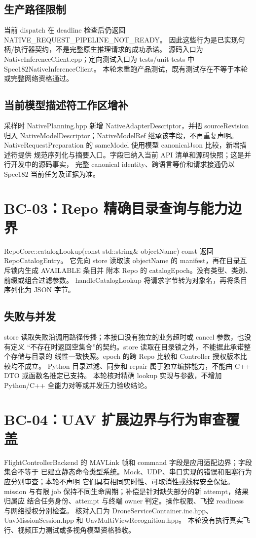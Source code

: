 \subsection{生产路径限制}
当前 dispatch 在 deadline 检查后仍返回 NATIVE\_REQUEST\_PIPELINE\_NOT\_READY。
因此这些行为是已实现句柄/执行器契约，不是完整原生推理请求的成功承诺。
源码入口为 NativeInferenceClient.cpp；定向测试入口为 tests/unit-tests 中 Spec182NativeInferenceClient。
本轮未重跑产品测试，既有测试存在不等于本轮或完整网络资格通过。

\subsection{当前模型描述符工作区增补}
采样时 NativePlanning.hpp 新增 NativeAdapterDescriptor，并把 sourceRevision 归入
NativeModelDescriptor；NativeModelRef 继承该字段，不再重复声明。
NativeRequestPreparation 的 sameModel 使用模型 canonicalJson 比较，新增描述符提供
规范序列化与摘要入口。字段已纳入当前 API 清单和源码快照；这是并行开发中的源码事实，
完整 canonical identity、跨语言等价和请求接通仍以 Spec182 当前任务及证据为准。

\section{BC-03：Repo 精确目录查询与能力边界}
RepoCore::catalogLookup(const std::string\& objectName) const 返回 RepoCatalogEntry。
它先向 store 读取该 objectName 的 manifest，再在目录互斥锁内生成 AVAILABLE 条目并
附本 Repo 的 catalogEpoch。没有类型、类别、前缀或组合过滤参数。
handleCatalogLookup 将请求字节转为对象名，再将条目序列化为 JSON 字节。

\subsection{失败与并发}
store 读取失败沿调用路径传播；本接口没有独立的业务超时或 cancel 参数，也没有定义
“不存在时返回空集合”的契约。store 读取在目录锁之外，不能据此承诺整个存储与目录的
线性一致快照。epoch 的跨 Repo 比较和 Controller 授权版本比较均不成立。
Python 目录过滤、同步和 repair 属于独立编排能力，不能由 C++ DTO 或函数名推定已支持。
本轮核对精确 lookup 实现与参数，不增加 Python/C++ 全能力对等或并发压力验收结论。

\section{BC-04：UAV 扩展边界与行为审查覆盖}
FlightControllerBackend 的 MAVLink 帧和 command 字段是应用适配边界；字段集合不等于
已建立静态命令类型系统。Mock、UDP、串口实现的错误和阻塞行为应分别审查；本轮不声明
它们具有相同实时性、可取消性或线程安全保证。
mission 与有限 job 保持不同生命周期；补偿是针对缺失部分的新 attempt，结果归属应
结合任务身份、attempt 与终端 owner 判定。操作权限、飞控 readiness 与网络授权分别检查。
核对入口为 DroneServiceContainer.inc.hpp、UavMissionSession.hpp 和 UavMultiViewRecognition.hpp。
本轮没有执行真实飞行、视频压力测试或多视角模型资格验收。

